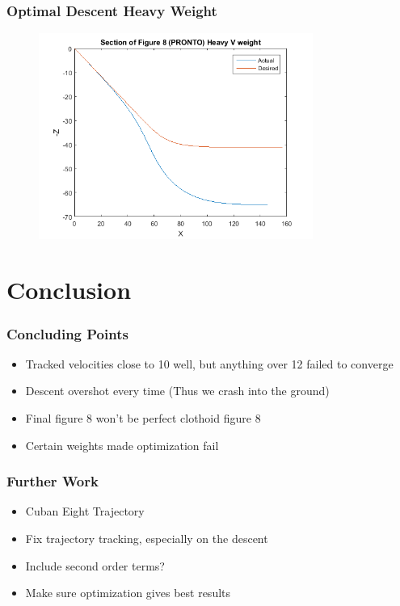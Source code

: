 \documentclass{beamer}
\begin{document}
    \begin{frame}
        \frametitle{Optimal Descent Heavy Weight}
        \begin{figure}
            \centering
            \includegraphics[width=0.8\textwidth]{opt_descent_HW.png}
        \end{figure}
    \end{frame}

    \section{Conclusion}
    \begin{frame}
        \frametitle{Concluding Points}
        \begin{itemize}
            \item Tracked velocities close to 10 well, but anything over 12 failed to converge
            \item Descent overshot every time (Thus we crash into the ground)
            \item Final figure 8 won't be perfect clothoid figure 8
            \item Certain weights made optimization fail 
        \end{itemize}
    \end{frame}

    \begin{frame}
        \frametitle{Further Work}
        \begin{itemize}
            \item Cuban Eight Trajectory
            \item Fix trajectory tracking, especially on the descent
            \item Include second order terms?
            \item Make sure optimization gives best results
        \end{itemize}
    \end{frame}
\end{document}

